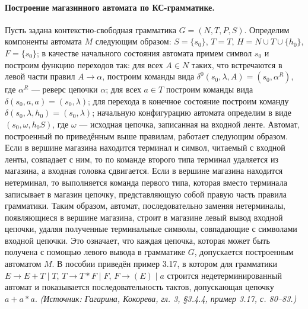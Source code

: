 \documentclass[a4paper,12pt]{article}
\begin{document}
\paragraph{Построение магазинного автомата по КС-грамматике.}
Пусть задана контекстно-свободная грамматика \(G=(N,T,P,S)\). Определим компоненты автомата \(M\) следующим образом: \(S=\{s_0\}\), \(T=T\), \(H=N\cup T\cup\{h_0\}\), \(F=\{s_0\}\); в качестве начального состояния автомата примем символ \(s_0\) и построим функцию переходов так: для всех \(A\in N\) таких, что встречаются в левой части правил \(A\to\alpha\), построим команды вида \(\delta^0(s_0,\lambda,A)=(s_0,\alpha^R)\), где \(\alpha^R\) — реверс цепочки \(\alpha\); для всех \(a\in T\) построим команды вида \(\delta(s_0,a,a)=(s_0,\lambda)\); для перехода в конечное состояние построим команду \(\delta(s_0,\lambda,h_0)=(s_0,\lambda)\); начальную конфигурацию автомата определим в виде \((s_0,\omega,h_0S)\), где \(\omega\) — исходная цепочка, записанная на входной ленте. Автомат, построенный по приведённым выше правилам, работает следующим образом. Если в вершине магазина находится терминал и символ, читаемый с входной ленты, совпадает с ним, то по команде второго типа терминал удаляется из магазина, а входная головка сдвигается. Если в вершине магазина находится нетерминал, то выполняется команда первого типа, которая вместо терминала записывает в магазин цепочку, представляющую собой правую часть правила грамматики. Таким образом, автомат, последовательно заменяя нетерминалы, появляющиеся в вершине магазина, строит в магазине левый вывод входной цепочки, удаляя полученные терминальные символы, совпадающие с символами входной цепочки. Это означает, что каждая цепочка, которая может быть получена с помощью левого вывода в грамматике \(G\), допускается построенным автоматом \(M\). В пособии приведён пример 3.17, в котором для грамматики \(E\to E+T\mid T\), \(T\to T*F\mid F\), \(F\to(E)\mid a\) строится недетерминированный автомат и показывается последовательность тактов, допускающая цепочку \(a+a*a\).
\textit{(Источник: Гагарина, Кокорева, гл. 3, §3.4.4, пример 3.17, с. 80--83.)}
\end{document}

